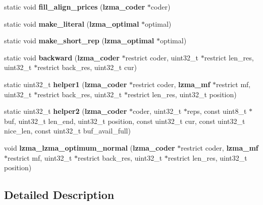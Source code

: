 \begin{DoxyCompactItemize}
\item 
static void {\bfseries fill\-\_\-align\-\_\-prices} ({\bf lzma\-\_\-coder} $\ast$coder)\label{lzma__encoder__optimum__normal_8c_afa8a06256448cc49788efc2450dcc980}

\item 
static void {\bfseries make\-\_\-literal} ({\bf lzma\-\_\-optimal} $\ast$optimal)\label{lzma__encoder__optimum__normal_8c_a56dff23e3ac332b61a652c6001a2238c}

\item 
static void {\bfseries make\-\_\-short\-\_\-rep} ({\bf lzma\-\_\-optimal} $\ast$optimal)\label{lzma__encoder__optimum__normal_8c_a7a5bf4462c330ea617215115064f97da}

\item 
static void {\bfseries backward} ({\bf lzma\-\_\-coder} $\ast$restrict coder, uint32\-\_\-t $\ast$restrict len\-\_\-res, uint32\-\_\-t $\ast$restrict back\-\_\-res, uint32\-\_\-t cur)\label{lzma__encoder__optimum__normal_8c_a2408243e3d98fdf9e363e480d6d972ae}

\item 
static uint32\-\_\-t {\bfseries helper1} ({\bf lzma\-\_\-coder} $\ast$restrict coder, {\bf lzma\-\_\-mf} $\ast$restrict mf, uint32\-\_\-t $\ast$restrict back\-\_\-res, uint32\-\_\-t $\ast$restrict len\-\_\-res, uint32\-\_\-t position)\label{lzma__encoder__optimum__normal_8c_a26e8f09e9a03604732c26e5132908f03}

\item 
static uint32\-\_\-t {\bfseries helper2} ({\bf lzma\-\_\-coder} $\ast$coder, uint32\-\_\-t $\ast$reps, const uint8\-\_\-t $\ast$buf, uint32\-\_\-t len\-\_\-end, uint32\-\_\-t position, const uint32\-\_\-t cur, const uint32\-\_\-t nice\-\_\-len, const uint32\-\_\-t buf\-\_\-avail\-\_\-full)\label{lzma__encoder__optimum__normal_8c_a91c3a7d6a701f2b55b2d91ab33bed4a2}

\item 
void {\bfseries lzma\-\_\-lzma\-\_\-optimum\-\_\-normal} ({\bf lzma\-\_\-coder} $\ast$restrict coder, {\bf lzma\-\_\-mf} $\ast$restrict mf, uint32\-\_\-t $\ast$restrict back\-\_\-res, uint32\-\_\-t $\ast$restrict len\-\_\-res, uint32\-\_\-t position)\label{lzma__encoder__optimum__normal_8c_ac60616f163a672ef8aed2ce1434f9bb6}

\end{DoxyCompactItemize}


\subsection{Detailed Description}
